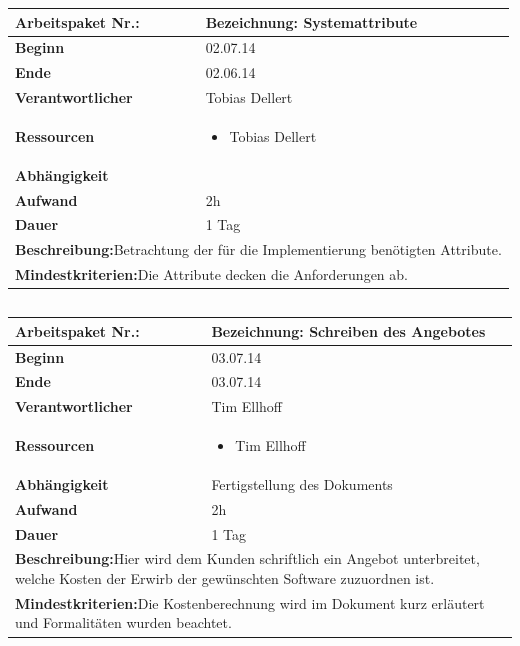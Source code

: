 \documentclass[fontsize=12pt,paper=a4,twoside]{scrartcl}
\begin{document}
	\begin{tabular}{|p{5.3cm}|p{9.7cm}|}\hline
		\textbf{Arbeitspaket Nr.:}  & \textbf{Bezeichnung:} Systemattribute\\ \hline \hline
		\textbf{Beginn} & 02.07.14\\ \hline
		\textbf{Ende} & 02.06.14\\ \hline
		\textbf{Verantwortlicher} & Tobias Dellert\\ \hline
		\textbf{Ressourcen} & \begin{itemize}
			\item Tobias Dellert 
		\end{itemize}    \\ \hline
		\textbf{Abhängigkeit} &\\ \hline
		\textbf{Aufwand} & 2h\\ \hline
		\textbf{Dauer} & 1 Tag\\ \hline
		\multicolumn{2}{|p{15cm}|}{\textbf{Beschreibung:}\newline Betrachtung der für die Implementierung benötigten Attribute. }\\ \hline
		\multicolumn{2}{|p{15cm}|}{\textbf{Mindestkriterien:}\newline Die Attribute decken die Anforderungen ab. }\\ \hline
	\end{tabular}
	
	\begin{verbatim} 
	\end{verbatim}
	
	\begin{tabular}{|p{5.3cm}|p{9.7cm}|}\hline
		\textbf{Arbeitspaket Nr.:}  & \textbf{Bezeichnung:} Schreiben des Angebotes\\ \hline \hline
		\textbf{Beginn} & 03.07.14\\ \hline
		\textbf{Ende} & 03.07.14\\ \hline
		\textbf{Verantwortlicher} & Tim Ellhoff\\ \hline
		\textbf{Ressourcen} & \begin{itemize}
			\item Tim Ellhoff
		\end{itemize}    \\ \hline
		\textbf{Abhängigkeit} & Fertigstellung des Dokuments\\ \hline
		\textbf{Aufwand} & 2h\\ \hline
		\textbf{Dauer} & 1 Tag\\ \hline
		\multicolumn{2}{|p{15cm}|}{\textbf{Beschreibung:}\newline Hier wird dem Kunden schriftlich ein Angebot unterbreitet, welche Kosten der Erwirb der gewünschten Software zuzuordnen ist. }\\ \hline
		\multicolumn{2}{|p{15cm}|}{\textbf{Mindestkriterien:}\newline Die Kostenberechnung wird im Dokument kurz erläutert und Formalitäten wurden beachtet. }\\ \hline
	\end{tabular}
	
\end{document}
